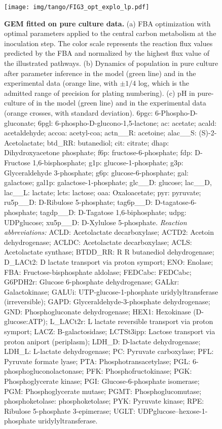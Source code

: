 \documentclass[../main.tex]{subfiles}
\begin{document}
\begin{figure}[htpb!]
    \centering
    \texttt{[image: img/tango/FIG3\_opt\_explo\_lp.pdf]}
    \caption{\textbf{\plantarum GEM fitted on pure culture data.} (a) FBA optimization with optimal parameters applied to the central carbon metabolism at the inoculation step. The color scale represents the reaction flux values predicted by the FBA and normalized by the highest flux value of the illustrated pathways. (b) Dynamics of \plantarum population in pure culture after parameter inference in the model (green line) and in the experimental data (orange line, with $\pm 1/4$ log, which is the admitted range of precision for plating numbering). (c) pH in pure-culture of \plantarum in the model (green line) and in the experimental data (orange crosses, with standard deviation). 6pgc: 6-Phospho-D-gluconate; 6pgl: 6-phospho-D-glucono-1,5-lactone; ac: acetate; acald: acetaldehyde; accoa: acetyl-coa; actn\_\_R: acetoine; alac\_\_S: (S)-2-Acetolactate; btd\_RR: butanediol; cit: citrate; dhap: Dihydroxyacetone phosphate; f6p: fructose-6-phosphate; fdp: D-Fructose 1,6-bisphosphate; g1p: glucose-1-phosphate; g3p: Glyceraldehyde 3-phosphate; g6p: glucose-6-phosphate; gal: galactose; gal1p: galactose-1-phosphate; glc\_\_D: glucose; lac\_\_D, lac\_\_L: lactate; lcts: lactose; oaa: Oxaloacetate; pyr: pyruvate; ru5p\_\_D: D-Ribulose 5-phosphate; tag6p\_\_D: D-tagatose-6-phosphate; tagdp\_\_D: D-Tagatose 1,6-biphosphate; udpg: UDPglucose; xu5p\_\_D: D-Xylulose 5-phosphate. \textit{Reaction abbreviations:} ACLD: Acetolactate decarboxylase; ACTD2: Acetoin dehydrogenase; ACLDC: Acetolactate decarboxylase; ACLS: Acetolactate synthase; BTDD\_RR:  R R  butanediol dehydrogenase; D\_LACt2: D lactate transport via proton symport; ENO: Enolase; FBA: Fructose-bisphosphate aldolase; FEDCabc: FEDCabc; G6PDH2r: Glucose 6-phosphate dehydrogenase; GALkr: Galactokinase; GALUi: UTP-glucose-1-phosphate uridylyltransferase (irreversible); GAPD: Glyceraldehyde-3-phosphate dehydrogenase; GND: Phosphogluconate dehydrogenase; HEX1: Hexokinase (D-glucose:ATP); L\_LACt2r: L lactate reversible transport via proton symport; LACZ: B-galactosidase; LCTSt3ipp: Lactose transport via proton aniport (periplasm); LDH\_D: D-lactate dehydrogenase; LDH\_L: L-lactate dehydrogenase; PC: Pyruvate carboxylase; PFL: Pyruvate formate lyase; PTA: Phosphotransacetylase; PGL: 6-phosphogluconolactonase; PFK: Phosphofructokinase; PGK: Phosphoglycerate kinase; PGI: Glucose-6-phosphate isomerase; PGM: Phosphoglycerate mutase; PGMT: Phosphoglucomutase; phosphoketolase: phosphoketolase; PYK: Pyruvate kinase; RPE: Ribulose 5-phosphate 3-epimerase; UGLT: UDPglucose--hexose-1-phosphate uridylyltransferase.}
    \label{dfba_metabolite_plant}
\end{figure}
\end{document}
